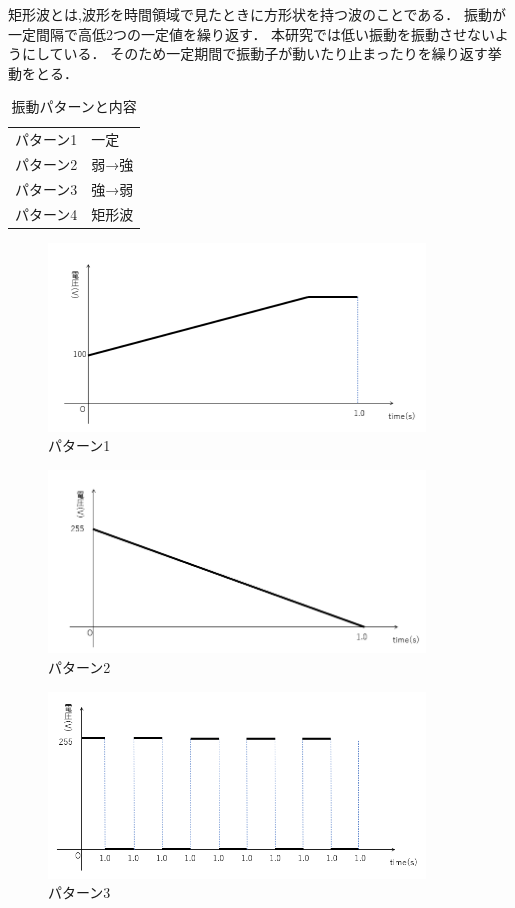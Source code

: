 矩形波とは,波形を時間領域で見たときに方形状を持つ波のことである．
振動が一定間隔で高低2つの一定値を繰り返す．
本研究では低い振動を振動させないようにしている．
そのため一定期間で振動子が動いたり止まったりを繰り返す挙動をとる．

\begin{table}[H]
    \caption{\label{tab;sindou}振動パターンと内容}
    \centering
    \begin{tabular}{l|l}
    \hline
    \hline
    パターン1 & 一定\\
    パターン2 & 弱→強\\
    パターン3 & 強→弱\\
    パターン4 & 矩形波\\
    \hline
    \end{tabular}
\end{table}


\begin{figure}[h]
\centering
\includegraphics[clip,width=10cm]{./fig/patarn1.png}
\caption{パターン1}\label{patarn1}
\end{figure}

\begin{figure}[h]
\centering
\includegraphics[clip,width=10cm]{./fig/patarn2.png}
\caption{パターン2}\label{patarn2}
\end{figure}

\begin{figure}[h]
\centering
\includegraphics[clip,width=10cm]{./fig/patarn3.png}
\caption{パターン3}\label{patarn3}
\end{figure}

